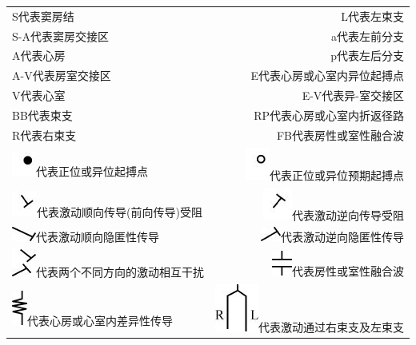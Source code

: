 \begin{longtable}{lr}
S代表窦房结&L代表左束支\\
S-A代表窦房交接区&a代表左前分支\\
A代表心房&p代表左后分支\\
A-V代表房室交接区&E代表心房或心室内异位起搏点\\
V代表心室&E-V代表异-室交接区\\
BB代表束支& RP代表心房或心室内折返径路\\
R代表右束支&FB代表房性或室性融合波\\
\includegraphics{./images/Image00125.jpg}代表正位或异位起搏点&\includegraphics{./images/Image00126.jpg}代表正位或异位预期起搏点\\
\includegraphics{./images/Image00127.jpg}代表激动顺向传导(前向传导)受阻&\includegraphics{./images/Image00128.jpg}代表激动逆向传导受阻\\
\includegraphics{./images/Image00129.jpg}代表激动顺向隐匿性传导&\includegraphics{./images/Image00130.jpg}代表激动逆向隐匿性传导\\
\includegraphics{./images/Image00131.jpg}代表两个不同方向的激动相互干扰&\includegraphics{./images/Image00132.jpg}代表房性或室性融合波\\
\includegraphics{./images/Image00133.jpg}代表心房或心室内差异性传导&\includegraphics{./images/Image00134.jpg}代表激动通过右束支及左束支\\

\end{longtable}
